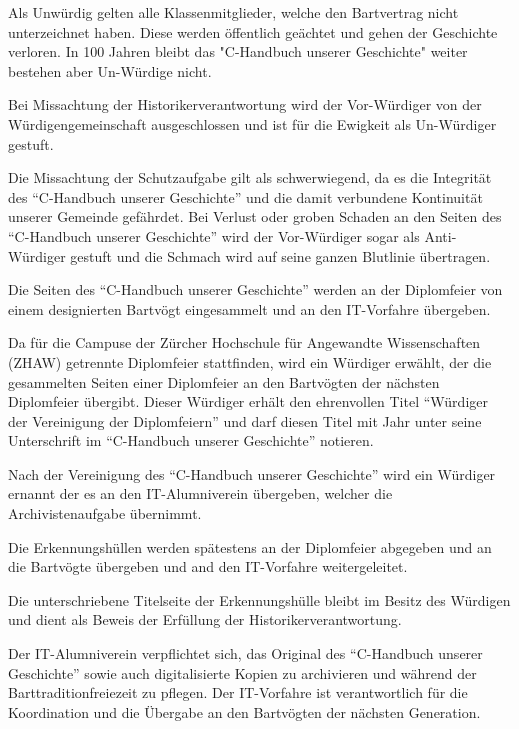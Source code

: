 \documentclass[fontsize=12pt,parskip=half]{scrartcl}
\begin{document}
\begin{contract}
  \Clause[title={Un-Würdige}]
  Als Unwürdig gelten alle Klassenmitglieder, welche den Bartvertrag nicht unterzeichnet haben. Diese werden öffentlich geächtet und gehen der Geschichte verloren. In 100 Jahren
  bleibt das "C-Handbuch unserer Geschichte" weiter bestehen aber Un-Würdige nicht.

  Bei Missachtung der Historikerverantwortung  wird der Vor-Würdiger von der Würdigengemeinschaft ausgeschlossen und ist für die Ewigkeit als
  Un-Würdiger gestuft.

  \Clause[title={Anti-Würdige}]
  Die Missachtung der Schutzaufgabe  gilt als schwerwiegend, da es die Integrität des ``C-Handbuch unserer Geschichte'' und die
  damit verbundene Kontinuität unserer Gemeinde gefährdet. Bei Verlust oder groben Schaden an den Seiten des ``C-Handbuch unserer Geschichte'' wird der Vor-Würdiger sogar als
  Anti-Würdiger gestuft und die Schmach wird auf seine ganzen Blutlinie übertragen.

  \Clause[title={Einsammlung}]\label{H.einsammlung}
  Die Seiten des ``C-Handbuch unserer Geschichte'' werden an der Diplomfeier von einem designierten Bartvögt eingesammelt und an den IT-Vorfahre übergeben.

  Da für die Campuse der Zürcher Hochschule für Angewandte Wissenschaften (ZHAW) getrennte Diplomfeier stattfinden, wird ein Würdiger erwählt, der die gesammelten
  Seiten einer Diplomfeier an den Bartvögten der nächsten Diplomfeier übergibt. Dieser Würdiger erhält den ehrenvollen Titel ``Würdiger der Vereinigung der Diplomfeiern'' und darf
  diesen Titel mit Jahr unter seine Unterschrift im ``C-Handbuch unserer Geschichte'' notieren.

  Nach der Vereinigung des ``C-Handbuch unserer Geschichte'' wird ein Würdiger ernannt der es an den IT-Alumniverein übergeben, welcher die Archivistenaufgabe  übernimmt.

  Die Erkennungshüllen werden spätestens an der Diplomfeier abgegeben und an die Bartvögte übergeben und and den IT-Vorfahre weitergeleitet.

  Die unterschriebene Titelseite der Erkennungshülle bleibt im Besitz des Würdigen und dient als Beweis der Erfüllung der Historikerverantwortung.

  \Clause[title={Archivistenaufgabe}]\label{H.archivistenaufgabe}
  Der IT-Alumniverein verpflichtet sich, das Original des ``C-Handbuch unserer Geschichte'' sowie auch digitalisierte Kopien zu archivieren und während der Barttraditionfreiezeit
  zu pflegen. Der IT-Vorfahre ist verantwortlich für die Koordination und die Übergabe an den Bartvögten der nächsten Generation.


\end{contract}
\end{document}
